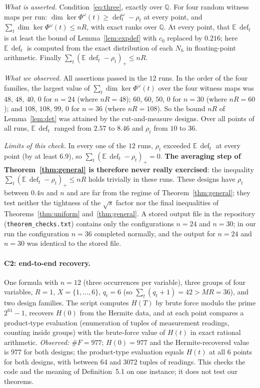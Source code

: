\documentclass[11pt,a4paper]{article}
\theoremstyle{definition}
\theoremstyle{remark}
\newcommand{\Q}{\mathbb{Q}}
\newcommand{\E}{\mathbb{E}}
\newcommand{\dfc}{\operatorname{def}}
\begin{document}
\emph{What is asserted.} Condition~\eqref{eq:three}, exactly over $\Q$. For four random
witness maps per run: $\dim\ker\Phi^\omega(t)\ge\dfc^\omega_t-\rho_t$ at every point, and
$\sum_t\dim\ker\Phi^\omega(t)\le nR$, with exact ranks over $\Q$. At every point, that
$\E\,\dfc_t$ is at least the bound of Lemma~\ref{lem:expdef} with $c_0$ replaced by $0.216$;
here $\E\,\dfc_t$ is computed from the exact distribution of each $N_h$ in floating-point
arithmetic. Finally $\sum_t(\E\,\dfc_t-\rho_t)_+\le nR$.

\emph{What we observed.} All assertions passed in the $12$ runs. In the order of the four families, the largest value of
$\sum_t\dim\ker\Phi^\omega(t)$ over the four witness maps was $48$, $48$, $40$, $0$ for
$n=24$ (where $nR=48$); $60$, $60$, $50$, $0$ for $n=30$ (where $nR=60$); and $108$, $108$,
$99$, $0$ for $n=36$ (where $nR=108$). So the bound $nR$ of Lemma~\ref{lem:det} was attained by the
cut-and-measure designs. Over all points of all runs, $\E\,\dfc_t$ ranged from $2.57$ to
$8.46$ and $\rho_t$ from $10$ to $36$.

\emph{Limits of this check.} In every one of the $12$ runs, $\rho_t$ exceeded $\E\,\dfc_t$
at every point (by at least $6.9$), so $\sum_t(\E\,\dfc_t-\rho_t)_+=0$. \textbf{The
averaging step of Theorem~\ref{thm:general} is therefore never really exercised}: the
inequality $\sum_t(\E\,\dfc_t-\rho_t)_+\le nR$ holds trivially in these runs. These designs
have $\rho_t$ between $0.4n$ and $n$ and are far from the regime of
Theorem~\ref{thm:general}; they test neither the tightness of the $\sqrt s$ factor nor the
final inequalities of Theorems~\ref{thm:uniform} and~\ref{thm:general}. A stored output
file in the repository (\texttt{theorem\_checks.txt}) contains only the configurations
$n=24$ and $n=30$; in our run the configuration $n=36$ completed normally, and the output
for $n=24$ and $n=30$ was identical to the stored file.

\paragraph{C2: end-to-end recovery.} One formula with $n=12$ (three occurrences per
variable), three groups of four variables, $R=1$, $X=\{1,\dots,6\}$, $q_t=6$ (so
$\sum_t(q_t+1)=42>MR=36$), and two design families. The script computes $H(T)$ by brute
force modulo the prime $2^{61}-1$, recovers $H(0)$ from the Hermite data, and at each point
compares a product-type evaluation (enumeration of tuples of measurement readings, counting
inside groups) with the brute-force value of $H(t)$ in exact rational arithmetic.
\emph{Observed:} $\#F=977$; $H(0)=977$ and the Hermite-recovered value is $977$ for both
designs; the product-type evaluation equals $H(t)$ at all $6$ points for both designs, with
between $64$ and $3072$ tuples of readings. This checks the code and the meaning of
Definition~5.1 on one instance; it does not test our theorems.
\end{document}
